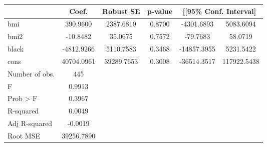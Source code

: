 {
\def\sym#1{\ifmmode^{#1}\else\(^{#1}\)\fi}
\begin{tabular}{l*{1}{ccccc}}
\toprule
            &       Coef.&   Robust SE&     p-value         &\multicolumn{2}{c}{[[95\% Conf. Interval]}            \\
\midrule
bmi         &    390.9600&   2387.6819&      0.8700         &  -4301.6893&   5083.6094\\
bmi2        &    -10.8482&     35.0675&      0.7572         &    -79.7683&     58.0719\\
black       &  -4812.9266&   5110.7583&      0.3468         & -14857.3955&   5231.5422\\
cons        &  40704.0961&  39289.7653&      0.3008         & -36514.3517& 117922.5438\\
\midrule
Number of obs.&         445&            &                     &            &            \\
F           &      0.9913&            &                     &            &            \\
Prob > F    &      0.3967&            &                     &            &            \\
R-squared   &      0.0049&            &                     &            &            \\
Adj R-squared&     -0.0019&            &                     &            &            \\
Root MSE    &  39256.7890&            &                     &            &            \\
\bottomrule
\end{tabular}
}
